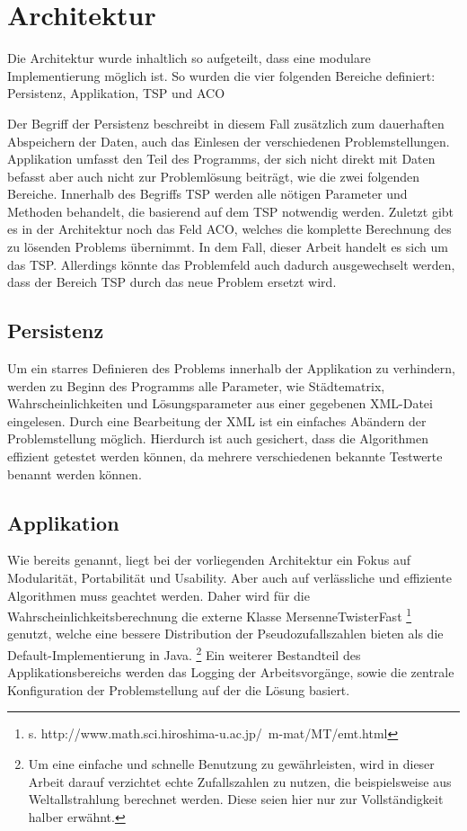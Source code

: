 \section{Architektur}{
	\label{architektur}
	Die Architektur wurde inhaltlich so aufgeteilt, dass eine modulare Implementierung möglich ist. So wurden die vier folgenden Bereiche definiert: Persistenz, Applikation, TSP und ACO
	
	Der Begriff der Persistenz beschreibt in diesem Fall zusätzlich zum dauerhaften Abspeichern der Daten, auch das Einlesen der verschiedenen Problemstellungen.
	\newline
	Applikation umfasst den Teil des Programms, der sich nicht direkt mit Daten befasst aber auch nicht zur Problemlösung beiträgt, wie die zwei folgenden Bereiche.
	\newline
	Innerhalb des Begriffs TSP werden alle nötigen Parameter und Methoden behandelt, die basierend auf dem \ac{TSP} notwendig werden. 
	\newline
	Zuletzt gibt es in der Architektur noch das Feld ACO, welches die komplette Berechnung des zu lösenden Problems übernimmt. In dem Fall, dieser Arbeit handelt es sich um das \ac{TSP}. Allerdings könnte das Problemfeld auch dadurch ausgewechselt werden, dass der Bereich \ac{TSP} durch das neue Problem ersetzt wird.
	
	\subsection{Persistenz}
	Um ein starres Definieren des Problems innerhalb der Applikation zu verhindern, werden zu Beginn des Programms alle Parameter, wie Städtematrix, Wahrscheinlichkeiten und Lösungsparameter aus einer gegebenen XML-Datei eingelesen. Durch eine Bearbeitung der XML ist ein einfaches Abändern der Problemstellung möglich. Hierdurch ist auch gesichert, dass die Algorithmen effizient getestet werden können, da mehrere verschiedenen bekannte Testwerte benannt werden können.
	
	\subsection{Applikation}
	Wie bereits genannt, liegt bei der vorliegenden Architektur ein Fokus auf Modularität, Portabilität und Usability. Aber auch auf verlässliche und effiziente Algorithmen muss geachtet werden. Daher wird für die Wahrscheinlichkeitsberechnung die externe Klasse MersenneTwisterFast \footnote{s. http://www.math.sci.hiroshima-u.ac.jp/~m-mat/MT/emt.html} genutzt, welche eine bessere Distribution der Pseudozufallszahlen bieten als die Default-Implementierung in Java.
	\footnote{Um eine einfache und schnelle Benutzung zu gewährleisten, wird in dieser Arbeit darauf verzichtet echte Zufallszahlen zu nutzen, die beispielsweise aus Weltallstrahlung berechnet werden. Diese seien hier nur zur Vollständigkeit halber erwähnt.}
	Ein weiterer Bestandteil des Applikationsbereichs werden das Logging der Arbeitsvorgänge, sowie die zentrale Konfiguration der Problemstellung auf der die Lösung basiert.
	
}
